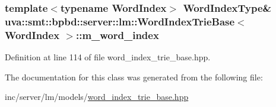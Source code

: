 \subsubsection[{m\+\_\+word\+\_\+index}]{\setlength{\rightskip}{0pt plus 5cm}template$<$typename Word\+Index$>$ {\bf Word\+Index\+Type}\& {\bf uva\+::smt\+::bpbd\+::server\+::lm\+::\+Word\+Index\+Trie\+Base}$<$ Word\+Index $>$\+::m\+\_\+word\+\_\+index\hspace{0.3cm}{\ttfamily [protected]}}\label{classuva_1_1smt_1_1bpbd_1_1server_1_1lm_1_1_word_index_trie_base_a57da26e5860ea31aa0f987e2ff478753}


Definition at line 114 of file word\+\_\+index\+\_\+trie\+\_\+base.\+hpp.



The documentation for this class was generated from the following file\+:\begin{DoxyCompactItemize}
\item 
inc/server/lm/models/\hyperlink{word__index__trie__base_8hpp}{word\+\_\+index\+\_\+trie\+\_\+base.\+hpp}\end{DoxyCompactItemize}
